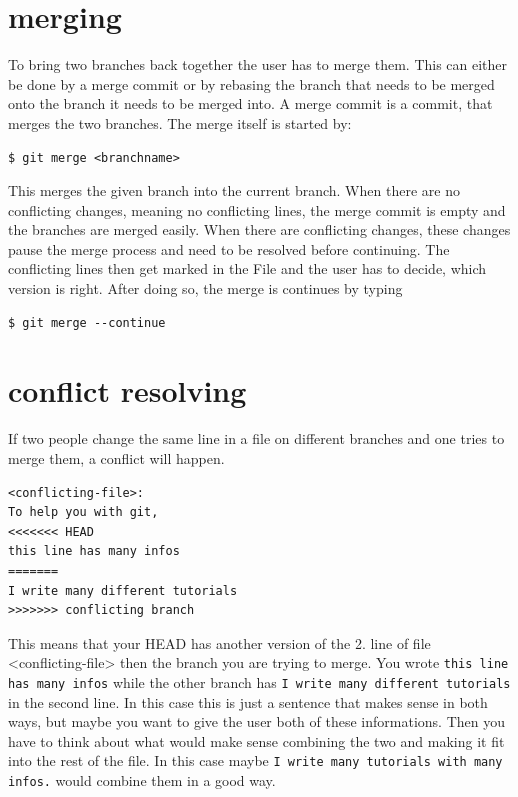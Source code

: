 \documentclass[a4paper, 12pt]{article}
\begin{document}
	\section{merging}
		
		To bring two branches back together the user has to merge them. This can either be done by a merge commit or by rebasing the branch that needs to be merged onto the branch it needs to be merged into. A merge commit is a commit, that merges the two branches. The merge itself is started by:
		
		\begin{lstlisting}
$ git merge <branchname>
		\end{lstlisting}
		
		This merges the given branch into the current branch. When there are no conflicting changes, meaning no conflicting lines, the merge commit is empty and the branches are merged easily. When there are conflicting changes, these changes pause the merge process and need to be resolved before continuing. The conflicting lines then get marked in the File and the user has to decide, which version is right. After doing so, the merge is continues by typing 
		
		\begin{lstlisting}
$ git merge --continue
		\end{lstlisting}
		
	\section{conflict resolving}
	
	If two people change the same line in a file on different branches and one tries to merge them, a conflict will happen.
	
	\begin{lstlisting}
<conflicting-file>:
To help you with git,
<<<<<<< HEAD
this line has many infos
=======
I write many different tutorials
>>>>>>> conflicting branch
	\end{lstlisting}
	
	This means that your HEAD has another version of the 2. line of file <conflicting-file> then the branch you are trying to merge. You wrote \lstinline|this line has many infos| while the other branch has \lstinline|I write many different tutorials| in the second line. In this case this is just a sentence that makes sense in both ways, but maybe you want to give the user both of these informations. Then you have to think about what would make sense combining the two and making it fit into the rest of the file. In this case maybe \lstinline|I write many tutorials with many infos.| would combine them in a good way.
	
\end{document}
